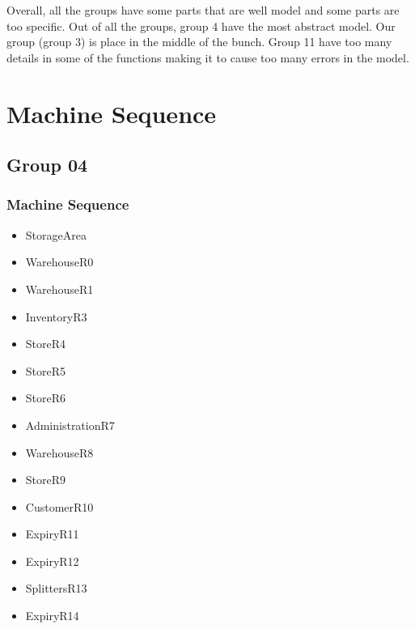 Overall, all the groups have some parts that are well model and some parts are too specific. Out of all the groups, group 4 have the most abstract model. Our group (group 3) is place in the middle of the bunch. Group 11 have too many details in some of the functions making it to cause too many errors in the model. 

\section{Machine Sequence}
\label{machinesequence}

\subsection{Group 04}
\label{group04}

\subsubsection{Machine Sequence}
\label{machinesequence}

\begin{itemize}
\item StorageArea

\item WarehouseR0

\item WarehouseR1

\item InventoryR3

\item StoreR4

\item StoreR5

\item StoreR6

\item AdministrationR7

\item WarehouseR8

\item StoreR9

\item CustomerR10

\item ExpiryR11

\item ExpiryR12

\item SplittersR13

\item ExpiryR14

\end{itemize}

